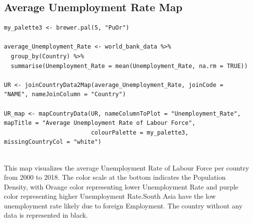 \documentclass{article}\usepackage[]{graphicx}\usepackage[]{xcolor}
\begin{document}
\subsection{Average Unemployment Rate Map}
\begin{lstlisting}
my_palette3 <- brewer.pal(5, "PuOr")

average_Unemployment_Rate <- world_bank_data %>%
  group_by(Country) %>%
  summarise(Unemployment_Rate = mean(Unemployment_Rate, na.rm = TRUE))

UR <- joinCountryData2Map(average_Unemployment_Rate, joinCode = "NAME", nameJoinColumn = "Country")

UR_map <- mapCountryData(UR, nameColumnToPlot = "Unemployment_Rate", mapTitle = "Average Unemployment Rate of Labour Force", 
                         colourPalette = my_palette3, missingCountryCol = "white")


\end{lstlisting}
This map visualizes the average Unemployment Rate of Labour Force per country from 2000 to 2018. The color scale at the bottom indicates the Population Density, with Orange color representing lower Unemployment Rate and purple color representing higher Unemployment Rate.South Asia have the low unemployment rate likely due to foreign Employment. The country without any data is represented in black.
\newpage
\end{document}
